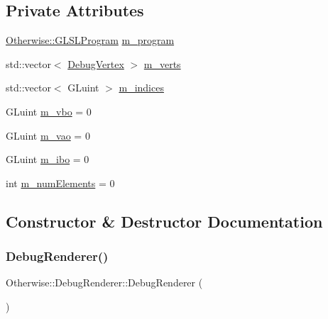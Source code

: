 \subsection*{Private Attributes}
\begin{DoxyCompactItemize}
\item 
\hyperlink{class_otherwise_1_1_g_l_s_l_program}{Otherwise\+::\+G\+L\+S\+L\+Program} \hyperlink{class_otherwise_1_1_debug_renderer_a659d64860c3d1994f1f581d50e2eeaa8}{m\+\_\+program}
\item 
std\+::vector$<$ \hyperlink{struct_otherwise_1_1_debug_renderer_1_1_debug_vertex}{Debug\+Vertex} $>$ \hyperlink{class_otherwise_1_1_debug_renderer_af52399f545c549d6ddd517d68052d165}{m\+\_\+verts}
\item 
std\+::vector$<$ G\+Luint $>$ \hyperlink{class_otherwise_1_1_debug_renderer_af08f71f8d7d76a3aabf43afbf8ae8d00}{m\+\_\+indices}
\item 
G\+Luint \hyperlink{class_otherwise_1_1_debug_renderer_ab225e8b51a3c0dae05445d7574dc733d}{m\+\_\+vbo} = 0
\item 
G\+Luint \hyperlink{class_otherwise_1_1_debug_renderer_aff45d71f024e29b4ffbdf9e6faeeac1d}{m\+\_\+vao} = 0
\item 
G\+Luint \hyperlink{class_otherwise_1_1_debug_renderer_abca037e08206c6e6a5bc3c51806e1fb3}{m\+\_\+ibo} = 0
\item 
int \hyperlink{class_otherwise_1_1_debug_renderer_a9621cbd947a5edac2213c70369396d3f}{m\+\_\+num\+Elements} = 0
\end{DoxyCompactItemize}


\subsection{Constructor \& Destructor Documentation}
\mbox{\label{class_otherwise_1_1_debug_renderer_a1a7b2b1eea49c096e5c94c9333e3c5f2}} 
\subsubsection{\texorpdfstring{Debug\+Renderer()}{DebugRenderer()}}
{\footnotesize\ttfamily Otherwise\+::\+Debug\+Renderer\+::\+Debug\+Renderer (\begin{DoxyParamCaption}{ }\end{DoxyParamCaption})}

